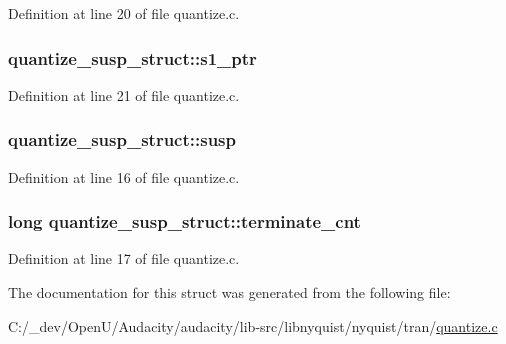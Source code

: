 Definition at line 20 of file quantize.\+c.

\subsubsection[{\texorpdfstring{s1\+\_\+ptr}{s1_ptr}}]{ quantize\+\_\+susp\+\_\+struct\+::s1\+\_\+ptr}\hypertarget{structquantize__susp__struct_ac714b40b000e2a534180db62f1a12979}{}\label{structquantize__susp__struct_ac714b40b000e2a534180db62f1a12979}


Definition at line 21 of file quantize.\+c.

\subsubsection[{\texorpdfstring{susp}{susp}}]{ quantize\+\_\+susp\+\_\+struct\+::susp}\hypertarget{structquantize__susp__struct_aef6c5503b7f8bebef7c32ae206eca637}{}\label{structquantize__susp__struct_aef6c5503b7f8bebef7c32ae206eca637}


Definition at line 16 of file quantize.\+c.

\subsubsection[{\texorpdfstring{terminate\+\_\+cnt}{terminate_cnt}}]{\setlength{\rightskip}{0pt plus 5cm}long quantize\+\_\+susp\+\_\+struct\+::terminate\+\_\+cnt}\hypertarget{structquantize__susp__struct_a130b67dd9a1c8539d86baba0cf76e8de}{}\label{structquantize__susp__struct_a130b67dd9a1c8539d86baba0cf76e8de}


Definition at line 17 of file quantize.\+c.



The documentation for this struct was generated from the following file\+:\begin{DoxyCompactItemize}
\item 
C\+:/\+\_\+dev/\+Open\+U/\+Audacity/audacity/lib-\/src/libnyquist/nyquist/tran/\hyperlink{quantize_8c}{quantize.\+c}\end{DoxyCompactItemize}
